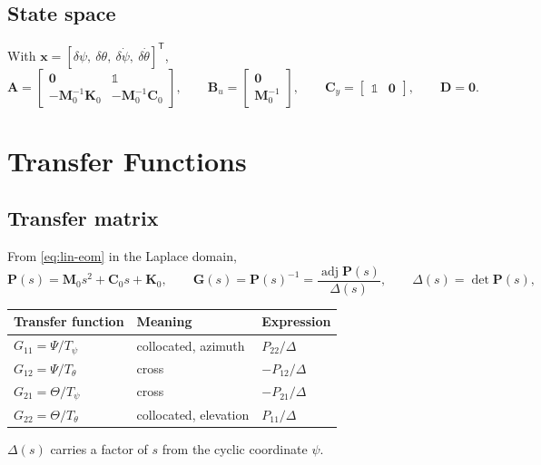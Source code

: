 \documentclass[11pt,a4paper]{article}
\numberwithin{equation}{section}
\newcommand{\bs}[1]{\boldsymbol{#1}}
\newcommand{\T}{^{\mathsf T}}
\begin{document}
\subsection{State space}

With $\bs x = [\delta\psi,\ \delta\theta,\ \delta\dot\psi,\ \delta\dot\theta]\T$,
\begin{equation}
\bs A = \begin{bmatrix} \bs 0 & \mathbb 1 \\ -\bs M_0^{-1}\bs K_0 & -\bs M_0^{-1}\bs C_0 \end{bmatrix},
\qquad
\bs B_u = \begin{bmatrix} \bs 0 \\ \bs M_0^{-1} \end{bmatrix},
\qquad
\bs C_y = \begin{bmatrix}\mathbb 1 & \bs 0\end{bmatrix},
\qquad
\bs D = \bs 0 .
\label{eq:statespace}
\end{equation}

\section{Transfer Functions}
\label{sec:tf}

\subsection{Transfer matrix}

From \eqref{eq:lin-eom} in the Laplace domain,
\begin{equation}
\bs P(s) = \bs M_0 s^2 + \bs C_0 s + \bs K_0 ,
\qquad
\bs G(s) = \bs P(s)^{-1} = \frac{\operatorname{adj}\bs P(s)}{\Delta(s)} ,
\qquad
\Delta(s) = \det\bs P(s) ,
\label{eq:Ps-Gs}
\end{equation}
\begin{center}
\begin{tabular}{@{}lll@{}}
\toprule
Transfer function & Meaning & Expression \\
\midrule
$G_{11}=\Psi/T_\psi$ & collocated, azimuth & $P_{22}/\Delta$ \\
$G_{12}=\Psi/T_\theta$ & cross & $-P_{12}/\Delta$ \\
$G_{21}=\Theta/T_\psi$ & cross & $-P_{21}/\Delta$ \\
$G_{22}=\Theta/T_\theta$ & collocated, elevation & $P_{11}/\Delta$ \\
\bottomrule
\end{tabular}
\end{center}
$\Delta(s)$ carries a factor of $s$ from the cyclic coordinate $\psi$.
\end{document}
